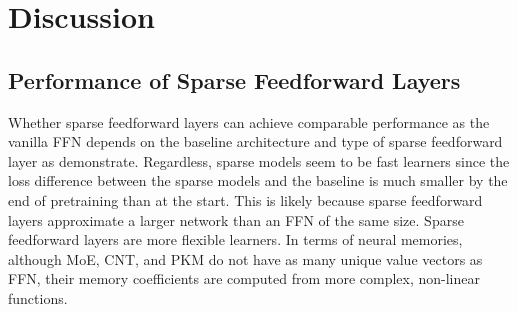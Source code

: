 \section{Discussion}
\label{sec:discussion}
\subsection{Performance of Sparse Feedforward Layers}
Whether sparse feedforward layers can achieve comparable performance as the vanilla FFN depends on the baseline architecture and type of sparse feedforward layer as  demonstrate. Regardless, sparse models seem to be fast learners since the loss difference between the sparse models and the baseline is much smaller by the end of pretraining than at the start. This is likely because sparse feedforward layers approximate a larger network than an FFN of the same size. Sparse feedforward layers are more flexible learners. In terms of neural memories, although MoE, CNT, and PKM do not have as many unique value vectors as FFN, their memory coefficients are computed from more complex, non-linear functions.



